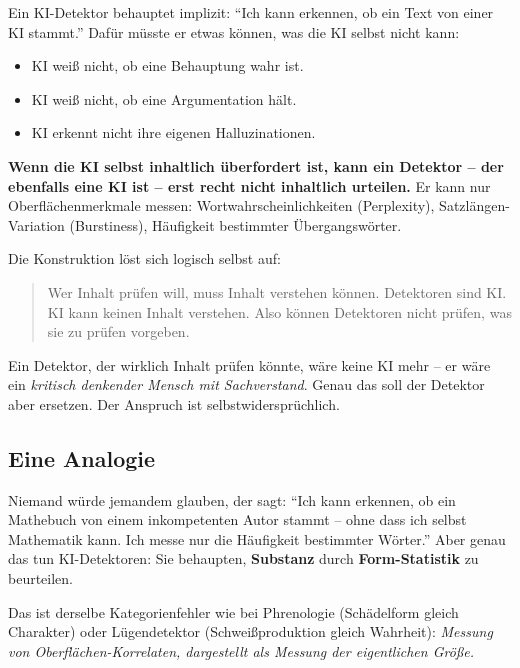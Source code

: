 Ein KI-Detektor behauptet implizit: \enquote{Ich kann erkennen, ob
ein Text von einer KI stammt.} Dafür müsste er etwas können, was
die KI selbst nicht kann:

\begin{itemize}[leftmargin=2em,itemsep=2pt,topsep=2pt]
  \item KI weiß nicht, ob eine Behauptung wahr ist.
  \item KI weiß nicht, ob eine Argumentation hält.
  \item KI erkennt nicht ihre eigenen Halluzinationen.
\end{itemize}

\textbf{Wenn die KI selbst inhaltlich überfordert ist, kann ein
Detektor -- der ebenfalls eine KI ist -- erst recht nicht
inhaltlich urteilen.} Er kann nur Oberflächenmerkmale messen:
Wortwahrscheinlichkeiten (Perplexity), Satzlängen-Variation
(Burstiness), Häufigkeit bestimmter Übergangswörter.

Die Konstruktion löst sich logisch selbst auf:

\begin{quote}
Wer Inhalt prüfen will, muss Inhalt verstehen können. Detektoren
sind KI. KI kann keinen Inhalt verstehen. Also können Detektoren
nicht prüfen, was sie zu prüfen vorgeben.
\end{quote}

Ein Detektor, der wirklich Inhalt prüfen könnte, wäre keine KI
mehr -- er wäre ein \emph{kritisch denkender Mensch mit Sachverstand}.
Genau das soll der Detektor aber ersetzen. Der Anspruch ist
selbstwidersprüchlich.

\subsection{Eine Analogie}

Niemand würde jemandem glauben, der sagt: \enquote{Ich kann
erkennen, ob ein Mathebuch von einem inkompetenten Autor stammt --
ohne dass ich selbst Mathematik kann. Ich messe nur die Häufigkeit
bestimmter Wörter.} Aber genau das tun KI-Detektoren: Sie
behaupten, \textbf{Substanz} durch \textbf{Form-Statistik} zu
beurteilen.

Das ist derselbe Kategorienfehler wie bei Phrenologie (Schädelform
gleich Charakter) oder Lügendetektor (Schweißproduktion gleich
Wahrheit): \emph{Messung von Oberflächen-Korrelaten, dargestellt
als Messung der eigentlichen Größe.}

